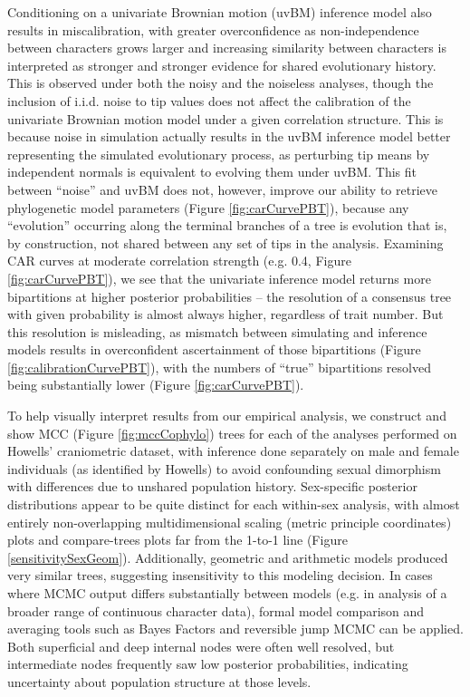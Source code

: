 Conditioning on a univariate Brownian motion (uvBM) inference model also results in miscalibration, with greater overconfidence as non-independence between characters grows larger and increasing similarity between characters is interpreted as stronger and stronger evidence for shared evolutionary history. This is observed under both the noisy and the noiseless analyses, though the inclusion of i.i.d. noise to tip values does not affect the calibration of the univariate Brownian motion model under a given correlation structure. This is because noise in simulation actually results in the uvBM inference model better representing the simulated evolutionary process, as perturbing tip means by independent normals is equivalent to evolving them under uvBM. This fit between “noise” and uvBM does not, however, improve our ability to retrieve phylogenetic model parameters (Figure \ref{fig:carCurvePBT}), because any “evolution” occurring along the terminal branches of a tree is evolution that is, by construction, not shared between any set of tips in the analysis. Examining CAR curves at moderate correlation strength (e.g. 0.4, Figure \ref{fig:carCurvePBT}), we see that the univariate inference model returns more bipartitions at higher posterior probabilities – the resolution of a consensus tree with given probability is almost always higher, regardless of trait number. But this resolution is misleading, as mismatch between simulating and inference models results in overconfident ascertainment of those bipartitions (Figure \ref{fig:calibrationCurvePBT}), with the numbers of “true” bipartitions resolved being substantially lower (Figure \ref{fig:carCurvePBT}).

To help visually interpret results from our empirical analysis, we construct and show MCC (Figure \ref{fig:mccCophylo}) trees for each of the analyses performed on Howells’ craniometric dataset, with inference done separately on male and female individuals (as identified by Howells) to avoid confounding sexual dimorphism with differences due to unshared population history. Sex-specific posterior distributions appear to be quite distinct for each within-sex analysis, with almost entirely non-overlapping multidimensional scaling (metric principle coordinates) plots and compare-trees plots far from the 1-to-1 line (Figure \ref{sensitivitySexGeom}). Additionally, geometric and arithmetic models produced very similar trees, suggesting insensitivity to this modeling decision. In cases where MCMC output differs substantially between models (e.g. in analysis of a broader range of continuous character data), formal model comparison and averaging tools such as Bayes Factors and reversible jump MCMC can be applied. Both superficial and deep internal nodes were often well resolved, but intermediate nodes frequently saw low posterior probabilities, indicating uncertainty about population structure at those levels. 

